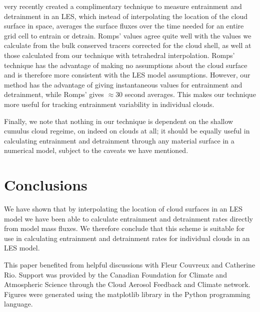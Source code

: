 \documentclass[12pt]{article}
\begin{document}
\cite{Romps2010} very recently created a complimentary technique to measure 
entrainment and detrainment in an LES, which instead of interpolating the 
location of the cloud surface in space, averages the surface fluxes over the 
time needed for an entire grid cell to entrain or detrain.  Romps' values agree 
quite well with the values we calculate from the bulk conserved tracers 
corrected for the cloud shell, as well at those calculated from our technique 
with tetrahedral interpolation.  Romps' technique has the advantage of making 
no assumptions about the cloud surface and is therefore more consistent with 
the LES model assumptions.  However, our method has the advantage of giving 
instantaneous values for entrainment and detrainment, while Romps' gives 
$\approx$30 second averages.  This makes our technique more useful for tracking 
entrainment variability in individual clouds.

Finally, we note that nothing in our technique is dependent on the shallow 
cumulus cloud regeime, on indeed on clouds at all; it should be equally useful
in calculating entrainment and detrainment through any material surface in a 
numerical model, subject to the caveats we have mentioned.


\section{Conclusions}

We have shown that by interpolating the location of cloud surfaces in an LES
model we have been able to calculate entrainment and detrainment rates directly 
from model mass fluxes.  We therefore conclude that this scheme is suitable for 
use in calculating entrainment and detrainment rates for individual clouds in 
an LES model.



\begin{acknowledgment}
This paper benefited from helpful discussions with Fleur Couvreux and Catherine 
Rio.  Support was provided by the Canadian Foundation for Climate and 
Atmospheric Science through the Cloud Aerosol Feedback and Climate network.
Figures were generated using the matplotlib library in the Python programming 
language.
\end{acknowledgment}

\end{document}
